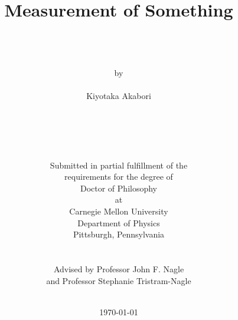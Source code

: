 \documentclass[12pt,twoside]{report}
\author{\\
	\\
	\\
	by \\
	\\
      	Kiyotaka Akabori \\
	\\
	\\
	\\
	\\
	\\
        Submitted in partial fulfillment of the \\
        requirements for the degree of \\
        Doctor of Philosophy \\
        at \\
        Carnegie Mellon University \\
        Department of Physics \\
        Pittsburgh, Pennsylvania \\
	\\
        \\
	Advised by Professor John F. Nagle \\
	and 
	Professor Stephanie Tristram-Nagle
	\\
	\\
}
\title{\bf{
Measurement of Something 
}}
\date{\today}
\begin{document}
 



\thispagestyle{empty}

\maketitle


\thispagestyle{empty} \cleardoublepage

%

%


\thispagestyle{empty} \cleardoublepage


%

%
\printglossaries


\tableofcontents 

\listoftables

\listoffigures

\clearpage 






\begin{appendices}
  
\end{appendices}



%
\end{document}
